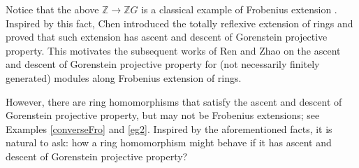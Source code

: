 \documentclass{amsart}
\newcommand{\Z}{\mathbb{Z}}
\newcommand{\0}{{\bf{0}}}
\DeclareMathOperator{\RHom}{\mathsf{RHom}}
\newtheorem{theorem}{Theorem}[section]
\theoremstyle{definition}
\begin{document}
Notice that the above $\Z\rightarrow \Z G$ is a classical example of Frobenius extension \cite{Kas}. Inspired by this fact, Chen \cite{Chen} introduced the totally reflexive extension of rings and proved that such extension has ascent and descent of Gorenstein projective property. This motivates the subsequent works of Ren \cite{Ren} and Zhao \cite{Zhao} on the ascent and descent of Gorenstein projective property for (not necessarily finitely generated) modules along Frobenius extension of rings.

However, there are ring homomorphisms that satisfy the ascent and descent of Gorenstein projective property, but may not be Frobenius extensions; see Examples \ref{converseFro} and \ref{eg2}. Inspired by the aforementioned facts, it is natural to ask: how a ring homomorphism might behave if it has ascent and descent of Gorenstein projective property?




\end{document}

